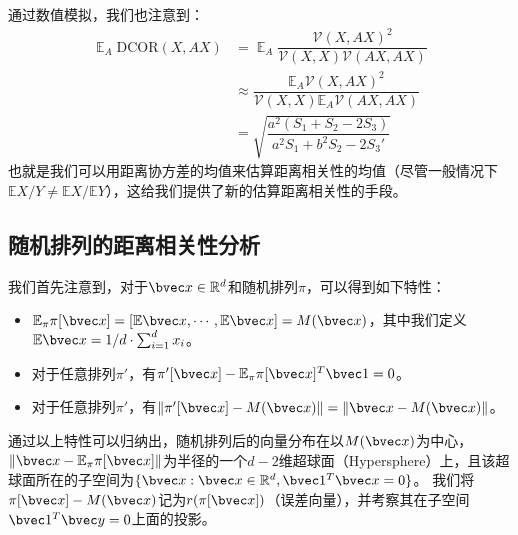 通过数值模拟，我们也注意到：
\begin{equation}
\label{eq:ss-perm:linear-dcor-estimation}
\begin{split}
    \mathop{\mathbb E}_A \text{DCOR}(X, AX) & = \mathop{\mathbb E}_A \dfrac{\mathcal{V}(X, AX)^2}{\mathcal{V}(X, X)\mathcal{V}(AX, AX)}
    \\
    &\approx \dfrac{\mathbb E_A \mathcal{V}(X, AX)^2}{\mathcal{V}(X, X) \mathbb E_A \mathcal{V}(AX, AX)}
    \\
    &= \sqrt{\dfrac{a^2(S_1 + S_2 - 2S_3)}{a^2S_1 + b^2S_2 - 2S_3'}}
\end{split}
\end{equation}
%
也就是我们可以用距离协方差的均值来估算距离相关性的均值（尽管一般情况下$\mathbb E X/Y \ne \mathbb E X/\mathbb E Y$），这给我们提供了新的估算距离相关性的手段。
%


\subsection{随机排列的距离相关性分析}
我们首先注意到，对于$\bvec x \in \mathbb R^d$和随机排列$\pi$，可以得到如下特性：
\begin{itemize}
    \item $\mathbb E_\pi \pi[\bvec x] = [\mathbb E\bvec x, \cdots, \mathbb E\bvec x] = M(\bvec x)$，其中我们定义$\mathbb E\bvec x = 1/d \cdot \sum_{i=1}^d x_i$。
    \item 对于任意排列$\pi'$，有$\pi'[\bvec x] - \mathbb E_{\pi}\pi[\bvec x]^T \bvec 1 = 0$。
    \item 对于任意排列$\pi'$，有$\Vert \pi'[\bvec x] - M(\bvec x)\Vert = \Vert \bvec x - M(\bvec x)\Vert$。
\end{itemize}
%
通过以上特性可以归纳出，随机排列后的向量分布在以$M(\bvec x)$为中心，$\Vert \bvec x - \mathbb E_\pi \pi[\bvec x]\Vert$为半径的一个$d - 2$维超球面（Hypersphere）上，且该超球面所在的子空间为$\{\bvec x: \bvec x \in \mathbb R^d, \bvec 1^T\bvec x = 0\}$。
%
我们将$\pi[\bvec x] - M(\bvec x)$记为$r(\pi[\bvec x])$（误差向量），并考察其在子空间$\bvec 1^T \bvec y = 0$上面的投影。
%

